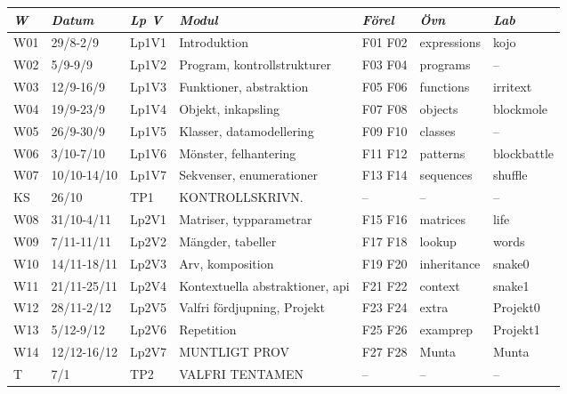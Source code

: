 \begin{tabular}{l|l|l|l|l|l|l}
\textit{W} & \textit{Datum} & \textit{Lp V} & \textit{Modul} & \textit{Förel} & \textit{Övn} & \textit{Lab} \\ \hline \hline
W01 & 29/8-2/9 & Lp1V1 & Introduktion & F01 F02 & expressions & kojo \\
W02 & 5/9-9/9 & Lp1V2 & Program, kontrollstrukturer & F03 F04 & programs & -- \\
W03 & 12/9-16/9 & Lp1V3 & Funktioner, abstraktion & F05 F06 & functions & irritext \\
W04 & 19/9-23/9 & Lp1V4 & Objekt, inkapsling & F07 F08 & objects & blockmole \\
W05 & 26/9-30/9 & Lp1V5 & Klasser, datamodellering & F09 F10 & classes & -- \\
W06 & 3/10-7/10 & Lp1V6 & Mönster, felhantering & F11 F12 & patterns & blockbattle \\
W07 & 10/10-14/10 & Lp1V7 & Sekvenser, enumerationer & F13 F14 & sequences & shuffle \\
KS & 26/10 & TP1 & KONTROLLSKRIVN. & -- & -- & -- \\
W08 & 31/10-4/11 & Lp2V1 & Matriser, typparametrar & F15 F16 & matrices & life \\
W09 & 7/11-11/11 & Lp2V2 & Mängder, tabeller & F17 F18 & lookup & words \\
W10 & 14/11-18/11 & Lp2V3 & Arv, komposition & F19 F20 & inheritance & snake0 \\
W11 & 21/11-25/11 & Lp2V4 & Kontextuella abstraktioner, api & F21 F22 & context & snake1 \\
W12 & 28/11-2/12 & Lp2V5 & Valfri fördjupning, Projekt & F23 F24 & extra & Projekt0 \\
W13 & 5/12-9/12 & Lp2V6 & Repetition & F25 F26 & examprep & Projekt1 \\
W14 & 12/12-16/12 & Lp2V7 & MUNTLIGT PROV & F27 F28 & Munta & Munta \\
T & 7/1 & TP2 & VALFRI TENTAMEN & -- & -- & -- \\
\end{tabular}

